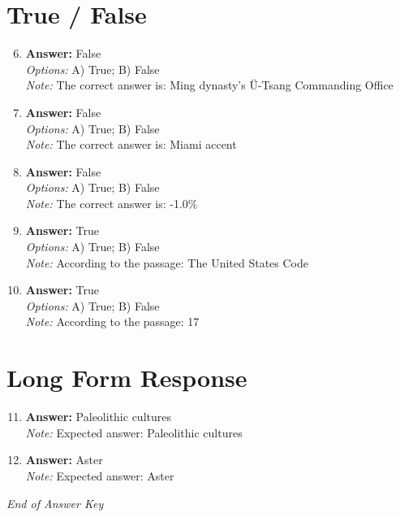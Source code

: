 \documentclass[12pt]{article}
\begin{document}
\section*{True / False}
\begin{enumerate}[label=\arabic*.]
\setcounter{enumi}{5}
\item \textbf{Answer:} False
\\ \textit{Options:} A) True; B) False
\\ \textit{Note:} The correct answer is: Ming dynasty's Ü-Tsang Commanding Office
\item \textbf{Answer:} False
\\ \textit{Options:} A) True; B) False
\\ \textit{Note:} The correct answer is: Miami accent
\item \textbf{Answer:} False
\\ \textit{Options:} A) True; B) False
\\ \textit{Note:} The correct answer is: -1.0\%
\item \textbf{Answer:} True
\\ \textit{Options:} A) True; B) False
\\ \textit{Note:} According to the passage: The United States Code
\item \textbf{Answer:} True
\\ \textit{Options:} A) True; B) False
\\ \textit{Note:} According to the passage: 17
\end{enumerate}

\section*{Long Form Response}
\begin{enumerate}[label=\arabic*.]
\setcounter{enumi}{10}
\item \textbf{Answer:} Paleolithic cultures
\\ \textit{Note:} Expected answer: Paleolithic cultures
\item \textbf{Answer:} Aster
\\ \textit{Note:} Expected answer: Aster
\end{enumerate}

\vfill
\noindent\textit{End of Answer Key}
\end{document}
